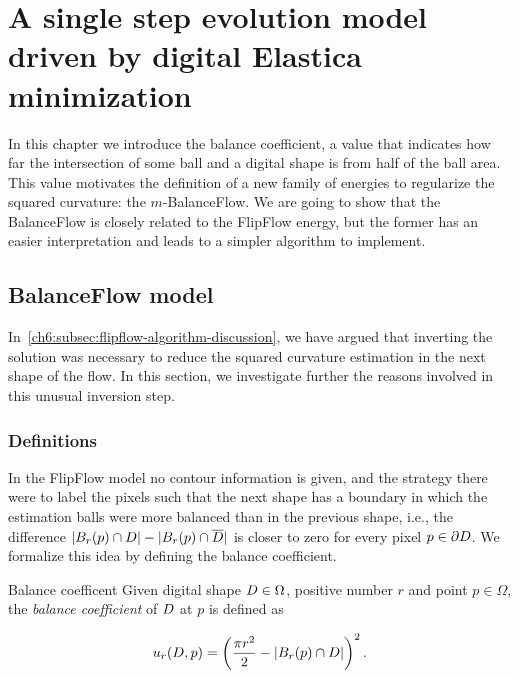 \chapter{A single step evolution model driven by digital Elastica minimization}
\label{chapter:balance-flow}


In this chapter we introduce the balance coefficient, a value that indicates how far the intersection of some ball and a digital shape is from half of the ball area. This value motivates the definition of a new family of energies to regularize the squared curvature: the $m$-BalanceFlow. We are going to show that the BalanceFlow is closely related to the FlipFlow energy, but the former has an easier interpretation and leads to a simpler algorithm to implement.


\section{BalanceFlow model}
In~\cref{ch6:subsec:flipflow-algorithm-discussion}, we have argued that inverting the solution was necessary to reduce the squared curvature estimation in the next shape of the flow. In this section, we investigate further the reasons involved in this unusual inversion step. 

\subsection{Definitions}

In the FlipFlow model no contour information is given, and the strategy there were to label the pixels such that the next shape has a boundary in which the estimation balls were more balanced than in the previous shape, i.e., the difference $|B_r(p) \cap D| - |B_r(p) \cap \overline{D}|$ is closer to zero for every pixel $p \in \partial D$.  We formalize this idea by defining the balance coefficient.

\begin{definition}{Balance coefficent}
Given digital shape $D \in \Omega$, positive number $r$ and point $p \in \Omega$, the \emph{balance coefficient} of $D$ at $p$ is defined as

\begin{align*}
	u_r(D,p) = \left( \frac{\pi r^2}{2} - |B_r(p) \cap D| \right)^2.
\end{align*}

\end{definition}

